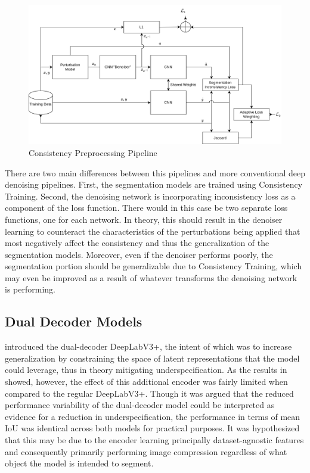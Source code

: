         \begin{figure}[htb]
            \centering
           \includegraphics[width=\linewidth]{illustrations/deep_preprocessing.png}
            \caption{Consistency Preprocessing Pipeline}
            \label{fig:preproc}
        \end{figure}
        
        There are two main differences between this pipelines and more conventional deep denoising pipelines. First, the segmentation models are trained using Consistency Training. Second, the denoising network is incorporating inconsistency loss as a component of the loss function. There would in this case be two separate loss functions, one for each network. In theory, this should result in the denoiser learning to counteract the characteristics of the perturbations being applied that most negatively affect the consistency and thus the generalization of the segmentation models. Moreover, even if the denoiser performs poorly, the segmentation portion should be generalizable due to Consistency Training, which may even be improved as a result of whatever transforms the denoising network is performing.
        
    \subsection{Dual Decoder Models}
         introduced the dual-decoder DeepLabV3+, the intent of which was to increase generalization by constraining the space of latent representations that the model could leverage, thus in theory mitigating underspecification. As the results in~ showed, however, the effect of this additional encoder was fairly limited when compared to the regular DeepLabV3+. Though it was argued that the reduced performance variability of the dual-decoder model could be interpreted as evidence for a reduction in underspecification, the performance in terms of mean IoU was identical across both models for practical purposes. It was hypothesized that this may be due to the encoder learning principally dataset-agnostic features and consequently primarily performing image compression regardless of what object the model is intended to segment. 
        


